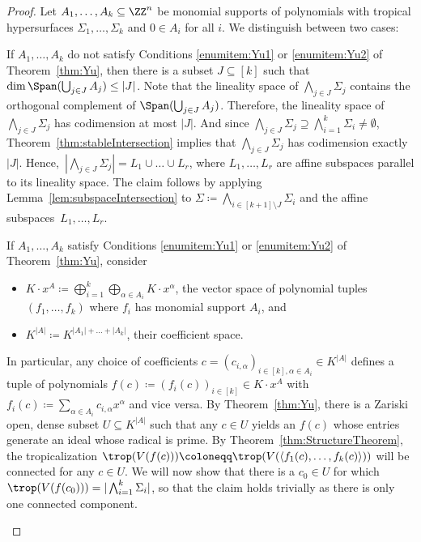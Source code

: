 \begin{proof}
  Let $A_1,\dots,A_k\subseteq\ZZ^n$ be monomial supports of polynomials with tropical hypersurfaces $\Sigma_1,\dots,\Sigma_k$ and $0\in A_i$ for all $i$. We distinguish between two cases:
  \begin{description}[leftmargin=0 pt]
  \item[Case 1] If $A_1,\dots,A_k$ do not satisfy Conditions \eqref{enumitem:Yu1} or \eqref{enumitem:Yu2} of Theorem~\ref{thm:Yu}, then there is a subset $J\subseteq [k]$ such that $\dim \Span (\bigcup_{j\in J} A_j)\leq |J|$.
    Note that the lineality space of $\bigwedge_{j\in J}\Sigma_j$ contains the orthogonal complement of $\Span (\bigcup_{j\in J} A_j)$. Therefore, the lineality space of $\bigwedge_{j\in J}\Sigma_j$ has codimension at most $|J|$. And since $\bigwedge_{j\in J}\Sigma_j\supseteq\bigwedge_{i=1}^k\Sigma_i \neq\emptyset$, Theorem~\ref{thm:stableIntersection} implies that $\bigwedge_{j\in J}\Sigma_j$ has codimension exactly $|J|$. Hence,~$|\bigwedge_{j\in J}\Sigma_j|=L_1\cup \dots\cup L_r$, where $L_1,\dots,L_r$ are affine subspaces parallel to its lineality space. The claim follows by applying Lemma~\ref{lem:subspaceIntersection} to $\Sigma\coloneqq\bigwedge_{i\in [k+1]\setminus J}\Sigma_i$ and the affine subspaces~$L_1,\dots,L_r$.
  \item[Case 2] If $A_1,\dots,A_k$ satisfy Conditions \eqref{enumitem:Yu1} or \eqref{enumitem:Yu2} of Theorem~\ref{thm:Yu}, consider
  \begin{itemize}
  \item $K\cdot x^A\coloneqq \bigoplus_{i=1}^k \bigoplus_{\alpha\in A_i} K\cdot x^{\alpha}$, the vector space of polynomial tuples $(f_1,\dots,f_k)$ where $f_i$ has monomial support $A_i$, and
  \item $K^{|A|}\coloneqq K^{|A_1|+\dots+|A_k|}$, their coefficient space.
  \end{itemize}
  In particular, any choice of coefficients $c=(c_{i,\alpha})_{i\in [k], \alpha\in A_i}\in K^{|A|}$ defines a tuple of polynomials $f(c)\coloneqq (f_i(c))_{i\in [k]}\in K\cdot x^A$ with $f_i(c)\coloneqq\sum_{\alpha\in A_i}c_{i,\alpha}x^\alpha$ and vice versa. By Theorem~\ref{thm:Yu}, there is a Zariski open, dense subset $U\subseteq K^{|A|}$ such that any $c\in U$ yields an $f(c)$ whose entries generate an ideal whose radical is prime. By Theorem~\ref{thm:StructureTheorem}, the tropicalization $\trop(V(f(c)))\coloneqq \trop(V(\langle f_1(c),\dots,f_k(c)\rangle))$ will be connected for any $c\in U$. We will now show that there is a $c_0\in U$ for which $\trop(V(f(c_0)))=|\bigwedge_{i=1}^k\Sigma_i|$, so that the claim holds trivially as there is only one connected component.


\end{description}
\end{proof}
